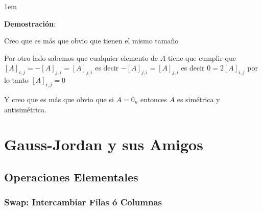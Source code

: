 \documentclass[12pt, fleqn]{report}                             %
\newenvironment{SmallIndentation}[1][0.75em]                    %
        {\begin{adjustwidth}{#1}{}\begin{footnotesize}}             %
        {\end{footnotesize}\end{adjustwidth}}                       %
\theoremstyle{break}                                            %
\begin{document}
\begin{itemize}
                            \begin{SmallIndentation}[1em]
                                \textbf{Demostración}:

                                Creo que es más que obvio que tienen el mismo tamaño

                                Por otro lado sabemos que cualquier elemento de $A$ tiene que cumplir
                                que $[A]_{i,j}=-[A]_{j,i} = [A]_{j,i}$ es decir $-[A]_{j,i} = [A]_{j,i}$
                                es decir $0 = 2[A]_{i,j}$ por lo tanto $[A]_{i,j} = 0$

                                Y creo que es más que obvio que si $A = 0_n$ entonces $A$ es simétrica y
                                antisimétrica.

                            \end{SmallIndentation}


                    \end{itemize}




    \clearpage
    \chapter{Gauss-Jordan y sus Amigos}




        \clearpage
        \section{Operaciones Elementales}




            \subsection{Swap: Intercambiar Filas ó Columnas}
\end{document}
